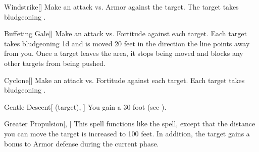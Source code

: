 \lowercase{\hypertarget{spell:Windstrike}{}}\label{spell:Windstrike}
\begin{freeability}[\nth{1}]{\hypertarget{spell:Windstrike}{Windstrike}}[]
Make an attack vs. Armor against the target.
\hit The target takes bludgeoning .
\end{freeability}
\vspace{0.25em}



\lowercase{\hypertarget{spell:Buffeting Gale}{}}\label{spell:Buffeting Gale}
\begin{freeability}[\nth{2}]{\hypertarget{spell:Buffeting Gale}{Buffeting Gale}}[]
Make an attack vs. Fortitude against each target.
\hit Each target takes bludgeoning  \minus1d and is moved 20 feet in the direction the line points away from you.
Once a target leaves the area, it stops being moved and blocks any other targets from being pushed.
\end{freeability}
\vspace{0.25em}



\lowercase{\hypertarget{spell:Cyclone}{}}\label{spell:Cyclone}
\begin{freeability}[\nth{2}]{\hypertarget{spell:Cyclone}{Cyclone}}[]
Make an attack vs. Fortitude against each target.
\hit Each target takes bludgeoning .
\end{freeability}
\vspace{0.25em}



\lowercase{\hypertarget{spell:Gentle Descent}{}}\label{spell:Gentle Descent}
\begin{attuneability}[\nth{2}]{\hypertarget{spell:Gentle Descent}{Gentle Descent}}[ (target), ]
You gain a 30 foot  (see ).
\end{attuneability}
\vspace{0.25em}



\lowercase{\hypertarget{spell:Greater Propulsion}{}}\label{spell:Greater Propulsion}
\begin{freeability}[\nth{2}]{\hypertarget{spell:Greater Propulsion}{Greater Propulsion}}[, ]
This spell functions like the  spell, except that the distance you can move the target is increased to 100 feet.
In addition, the target gains a  bonus to Armor defense during the current phase.
\end{freeability}
\vspace{0.25em}



